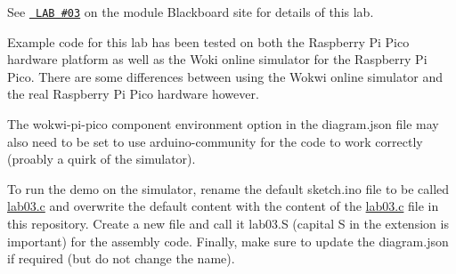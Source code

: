 See \href{https://tcd.blackboard.com/webapps/assignment/uploadAssignment?content_id=_2127029_1&course_id=_71874_1&group_id=&mode=cpview}{\texttt{ LAB \#03}} on the module Blackboard site for details of this lab.

Example code for this lab has been tested on both the Raspberry Pi Pico hardware platform as well as the Woki online simulator for the Raspberry Pi Pico. There are some differences between using the Wokwi online simulator and the real Raspberry Pi Pico hardware however.

The {\ttfamily wokwi-\/pi-\/pico} component environment option in the {\ttfamily diagram.\+json} file may also need to be set to use {\ttfamily arduino-\/community} for the code to work correctly (proably a quirk of the simulator).

To run the demo on the simulator, rename the default {\ttfamily sketch.\+ino} file to be called {\ttfamily \mbox{\hyperlink{lab03_8c}{lab03.\+c}}} and overwrite the default content with the content of the {\ttfamily \mbox{\hyperlink{lab03_8c}{lab03.\+c}}} file in this repository. Create a new file and call it {\ttfamily lab03.\+S} (capital S in the extension is important) for the assembly code. Finally, make sure to update the {\ttfamily diagram.\+json} if required (but do not change the name). 